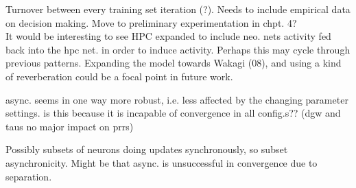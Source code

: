 Turnover between every training set iteration (?). Needs to include empirical data on decision making. Move to preliminary experimentation in chpt. 4?
\\

It would be interesting to see HPC expanded to include neo. nets activity fed back into the hpc net. in order to induce activity. Perhaps this may cycle through previous patterns. Expanding the model towards Wakagi (08), and using a kind of reverberation could be a focal point in future work.

async. seems in one way more robust, i.e. less affected by the changing parameter settings. is this because it is incapable of convergence in all config.s?? (dgw and taus no major impact on prrs)

Possibly subsets of neurons doing updates synchronously, so subset asynchronicity. Might be that async. is unsuccessful in convergence due to separation.


\cleardoublepage